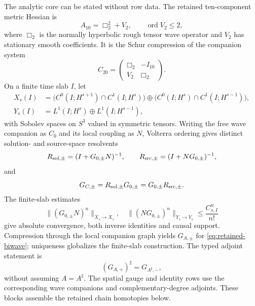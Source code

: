 \documentclass[11pt]{article}
\theoremstyle{definition}
\theoremstyle{remark}
\begin{document}
The analytic core can be stated without row data.  The retained ten-component
metric Hessian is
\begin{equation}\label{eq:retained-biwave}
 A_{10}=\Box_2^2+V_2,
 \qquad \operatorname{ord}V_2\leq2,
\end{equation}
where $\Box_2$ is the normally hyperbolic rough tensor wave operator and
$V_2$ has stationary smooth coefficients.  It is the Schur compression of
the companion system
\begin{equation}\label{eq:companion20}
 C_{20}=\begin{pmatrix}\Box_2&-I_{10}\\V_2&\Box_2\end{pmatrix}.
\end{equation}
On a finite time slab $I$, let
\begin{align}
 X_s(I)&=\bigl(C^0(I;H^{s+1})\cap C^1(I;H^s)\bigr)
 \oplus\bigl(C^0(I;H^s)\cap C^1(I;H^{s-1})\bigr),\\
 Y_s(I)&=L^1(I;H^s)\oplus L^1(I;H^{s-1}),
\end{align}
with Sobolev spaces on $S^3$ valued in symmetric tensors.  Writing the free
wave companion as $C_0$ and its local coupling as $N$, Volterra ordering gives
distinct solution- and source-space resolvents
\begin{equation}\label{eq:typed-resolvents}
 R_{{\rm sol},\pm}=(I+G_{0,\pm}N)^{-1},\qquad
 R_{{\rm src},\pm}=(I+NG_{0,\pm})^{-1},
\end{equation}
and
\begin{equation}
 G_{C,\pm}=R_{{\rm sol},\pm}G_{0,\pm}
 =G_{0,\pm}R_{{\rm src},\pm}.
\end{equation}
The finite-slab estimates
\begin{equation}\label{eq:factorial-estimate}
 \|(G_{0,\pm}N)^n\|_{X_s\to X_s},\quad
 \|(NG_{0,\pm})^n\|_{Y_s\to Y_s}
 \leq\frac{C_{s,I}^n}{n!}
\end{equation}
give absolute convergence, both inverse identities and causal support.
Compression through the local companion graph yields $G_{A,\pm}$ for
\eqref{eq:retained-biwave}; uniqueness globalizes the finite-slab
construction.  The typed adjoint statement is
\begin{equation}\label{eq:green-adjoint}
 (G_{A,+})^\sharp=G_{A^\sharp,-},
\end{equation}
without assuming $A=A^\sharp$.  The spatial gauge and identity rows use the
corresponding wave companions and complementary-degree adjoints.  These
blocks assemble the retained chain homotopies below.
\end{document}
